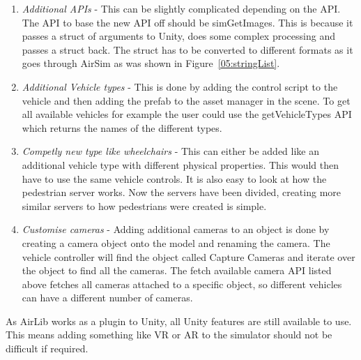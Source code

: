 \begin{enumerate}
\item \emph{Additional APIs} - This can be slightly complicated depending on the API. The API to base the new API off should be simGetImages. This is because it passes a struct of arguments to Unity, does some complex processing and passes a struct back. The struct has to be converted to different formats as it goes through AirSim as was shown in Figure~\ref{05:stringList}.
\item \emph{Additional Vehicle types} - This is done by adding the control script to the vehicle and then adding the prefab to the asset manager in the scene. To get all available vehicles for example the user could use the getVehicleTypes API which returns the names of the different types.  
\item \emph{Competly new type like wheelchairs} - This can either be added like an additional vehicle type with different physical properties. This would then have to use the same vehicle controls. It is also easy to look at how the pedestrian server works. Now the servers have been divided, creating more similar servers to how pedestrians were created is simple.  
\item \emph{Customise cameras} - Adding additional cameras to an object is done by creating a camera object onto the model and renaming the camera. The vehicle controller will find the object called Capture Cameras and iterate over the object to find all the cameras. The fetch available camera API listed above fetches all cameras attached to a specific object, so different vehicles can have a different number of cameras. 
\end{enumerate}

As AirLib works as a plugin to Unity, all Unity features are still available to use. This means adding something like VR or AR to the simulator should not be difficult if required.  







